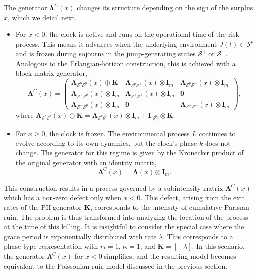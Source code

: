 \documentclass[11pt]{article}
\numberwithin{table}{section}
\numberwithin{figure}{section}
\numberwithin{equation}{section}
\newcommand{\1}{{\mathbf 1}}
\newcommand{\0}{\mat{0}}
\begin{document}
The generator \(\bm{\Lambda}^C(x)\) changes its structure depending on the sign of the surplus \(x\), which we detail next.
\begin{itemize}
    \item For \(x < 0\), the clock is active and runs on the operational time of the risk process. This means it advances when the underlying environment \(J(t) \in \mathcal{S}^p\) and is frozen during sojourns in the jump-generating states \(\mathcal{S}^+\) or \(\mathcal{S}^-\). Analogous to the Erlangian-horizon construction, this is achieved with a block matrix generator,
    \[
    \bm{\Lambda}^C(x) =
    \begin{pmatrix}
    \bm{\Lambda}_{\mathcal{S}^p\mathcal{S}^p}(x) \oplus \bm{K} & \bm{\Lambda}_{\mathcal{S}^p\mathcal{S}^+}(x) \otimes \bm{I}_m & \bm{\Lambda}_{\mathcal{S}^p\mathcal{S}^-}(x) \otimes \bm{I}_m \\
    \bm{\Lambda}_{\mathcal{S}^+\mathcal{S}^p}(x) \otimes \bm{I}_m & \bm{\Lambda}_{\mathcal{S}^+\mathcal{S}^+}(x) \otimes \bm{I}_m & \bm{0} \\
    \bm{\Lambda}_{\mathcal{S}^-\mathcal{S}^p}(x) \otimes \bm{I}_m & \bm{0} & \bm{\Lambda}_{\mathcal{S}^-\mathcal{S}^-}(x) \otimes \bm{I}_m
    \end{pmatrix},
    \]
    where \(\bm{\Lambda}_{\mathcal{S}^p\mathcal{S}^p}(x) \oplus \bm{K} = \bm{\Lambda}_{\mathcal{S}^p\mathcal{S}^p}(x) \otimes \bm{I}_m + \bm{I}_{|\mathcal{S}^p|} \otimes \bm{K}\).
    \item For \(x \ge 0\), the clock is frozen. The environmental process \(L\) continues to evolve according to its own dynamics, but the clock's phase \(k\) does not change. The generator for this regime is given by the Kronecker product of the original generator with an identity matrix,
    \[
    \bm{\Lambda}^C(x) = \bm{\Lambda}(x) \otimes \bm{I}_m.
    \]
\end{itemize}
This construction results in a process governed by a subintensity matrix \(\bm{\Lambda}^C(x)\) which has a non-zero defect only when \(x<0\). This defect, arising from the exit rates of the PH generator \(\bm{K}\), corresponds to the intensity of cumulative Parisian ruin. The problem is thus transformed into analyzing the location of the process at the time of this killing. It is insightful to consider the special case where the grace period is exponentially distributed with rate \(\lambda\). This corresponds to a phase-type representation with \(m=1\), \(\bm{\kappa}=1\), and \(\bm{K} = [-\lambda]\). In this scenario, the generator \(\bm{\Lambda}^C(x)\) for \(x < 0\) simplifies, and the resulting model becomes equivalent to the Poissonian ruin model discussed in the previous section.
\end{document}
